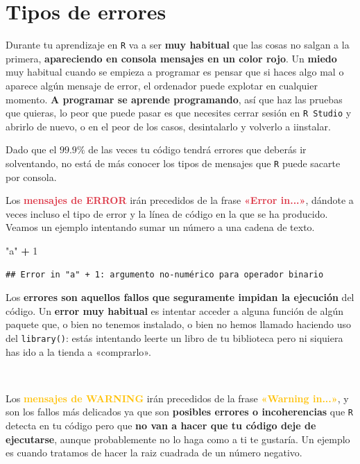 \documentclass[11pt,]{book}
\newenvironment{Shaded}{\begin{snugshade}}{\end{snugshade}}
\newcommand{\DecValTok}[1]{\textcolor[rgb]{0.06,0.06,0.06}{#1}}
\newcommand{\OperatorTok}[1]{\textcolor[rgb]{0.43,0.43,0.43}{\textbf{#1}}}
\newcommand{\StringTok}[1]{\textcolor[rgb]{0.5,0.5,0.5}{#1}}
\begin{document}
\hypertarget{tipos_errores}{%
\section{Tipos de errores}\label{tipos_errores}}

Durante tu aprendizaje en \texttt{R} va a ser \textbf{muy habitual} que las cosas no salgan a la primera, \textbf{apareciendo en consola mensajes en un color rojo}. Un \textbf{miedo} muy habitual cuando se empieza a programar es pensar que si haces algo mal o aparece algún mensaje de error, el ordenador puede explotar en cualquier momento. \textbf{A programar se aprende programando}, así que haz las pruebas que quieras, lo peor que puede pasar es que necesites cerrar sesión en \texttt{R\ Studio} y abrirlo de nuevo, o en el peor de los casos, desintalarlo y volverlo a iinstalar.

Dado que el \(99.9\%\) de las veces tu código tendrá errores que deberás ir solventando, no está de más conocer los tipos de mensajes que \texttt{R} puede sacarte por consola.

Los \textbf{\textcolor{#dc3545}{mensajes de ERROR}} irán precedidos de la frase \textbf{\textcolor{#dc3545}{«Error in...»}}, dándote a veces incluso el tipo de error y la línea de código en la que se ha producido. Veamos un ejemplo intentando sumar un número a una cadena de texto.

\begin{Shaded}
\begin{Highlighting}[]
\StringTok{"a"} \OperatorTok{+}\StringTok{ }\DecValTok{1}
\end{Highlighting}
\end{Shaded}

\begin{verbatim}
## Error in "a" + 1: argumento no-numérico para operador binario
\end{verbatim}

Los \textbf{errores son aquellos fallos que seguramente impidan la ejecución} del código. Un \textbf{error muy habitual} es intentar acceder a alguna función de algún paquete que, o bien no tenemos instalado, o bien no hemos llamado haciendo uso del \texttt{library()}: estás intentando leerte un libro de tu biblioteca pero ni siquiera has ido a la tienda a «comprarlo».

~

Los \textbf{\textcolor{#ffc107}{mensajes de WARNING}} irán precedidos de la frase \textbf{\textcolor{#ffc107}{«Warning in...»}}, y son los fallos más delicados ya que son \textbf{posibles errores o incoherencias} que \texttt{R} detecta en tu código pero que \textbf{no van a hacer que tu código deje de ejecutarse}, aunque probablemente no lo haga como a ti te gustaría. Un ejemplo es cuando tratamos de hacer la raiz cuadrada de un número negativo.
\end{document}

